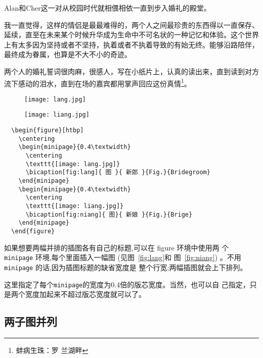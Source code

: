 Alan和Cher这一对从校园时代就相偎相依一直到步入婚礼的殿堂。

我一直觉得，这样的情侣是最最难得的，两个人之间最珍贵的东西得以一直保存、
延续，直至在未来某个时候升华成为生命中不可名状的一种记忆和体验。这个世界
上有太多因为坚持或者不坚持，执着或者不执着导致的有始无终。能够沿路陪伴，
最终成为眷属，也算是不大不小的奇迹。

两个人的婚礼誓词很肉麻，很感人，写在小纸片上，认真的读出来，直到读到对方
流下感动的泪水，直到在场的嘉宾都用掌声回应这份真情\footnote{蚌病生珠：罗
  兰湖畔}。

\begin{figure}[htbp]
  \centering
  \begin{minipage}{0.4\textwidth}
    \centering
    \texttt{[image: lang.jpg]}
  \end{minipage}
  \begin{minipage}{0.4\textwidth}
    \centering
    \texttt{[image: liang.jpg]}
  \end{minipage}
\end{figure}

\begin{lstlisting}
  \begin{figure}[htbp]
    \centering
    \begin{minipage}{0.4\textwidth}
      \centering
      \texttt{[image: lang.jpg]}
      \bicaption[fig:lang]{ 图 }{ 新郎 }{Fig.}{Bridegroom}
    \end{minipage}
    \begin{minipage}{0.4\textwidth}
      \centering
      \texttt{[image: liang.jpg]}
      \bicaption[fig:niang]{ 图}{ 新娘 }{Fig.}{Brige}
    \end{minipage}
  \end{figure}
\end{lstlisting}


如果想要两幅并排的插图各有自己的标题,可以在 figure 环境中使用两
个 \texttt{minipage} 环境,每个里面插入一幅图 (见图~\ref{fig:lang}和
图~\ref{fig:niang}) 。不用 \texttt{minipage} 的话,因为插图标题的缺省宽度是
整个行宽;两幅插图就会上下排列。

这里指定了每个\texttt{minipage}的宽度为0.4倍的版芯宽度。当然，也可以自
己指定，只是两个宽度加起来不超过版芯宽度就可以了。


\subsection{两子图并列}

